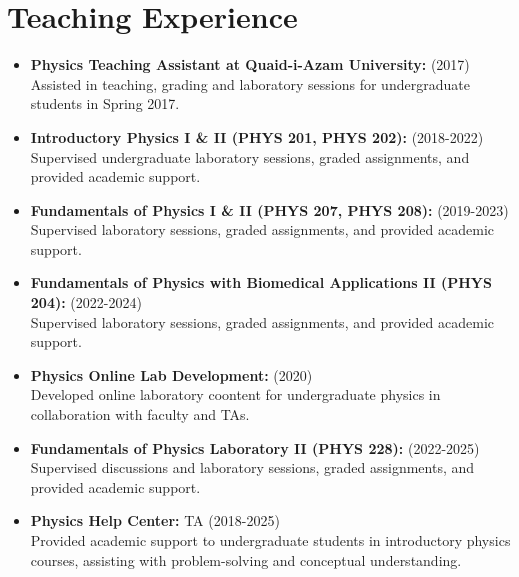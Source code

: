 \documentclass[letter,11pt]{article}
\begin{document}
\section{Teaching Experience}
\begin{itemize}
    \item \textbf{Physics Teaching Assistant at Quaid-i-Azam University:} (2017) \\ 
        Assisted in teaching, grading and laboratory sessions for undergraduate students in Spring 2017.
    \item \textbf{Introductory Physics I \& II (PHYS 201, PHYS 202):} (2018-2022) \\
        Supervised undergraduate laboratory sessions, graded assignments, and provided academic support.
    \item \textbf{Fundamentals of Physics I \& II (PHYS 207, PHYS 208):} (2019-2023) \\
        Supervised laboratory sessions, graded assignments, and provided academic support.
    \item \textbf{Fundamentals of Physics with Biomedical Applications II (PHYS 204):} (2022-2024) \\
        Supervised laboratory sessions, graded assignments, and provided academic support.
    \item \textbf{Physics Online Lab Development:} (2020) \\
        Developed online laboratory coontent for undergraduate physics in collaboration with faculty and TAs.
    \item \textbf{Fundamentals of Physics Laboratory II (PHYS 228):} (2022-2025) \\
        Supervised discussions and laboratory sessions, graded assignments, and provided academic support.
    \item \textbf{Physics Help Center:} TA (2018-2025) \\
        Provided academic support to undergraduate students in introductory physics courses, assisting with problem-solving and conceptual understanding.
\end{itemize}
\end{document}
